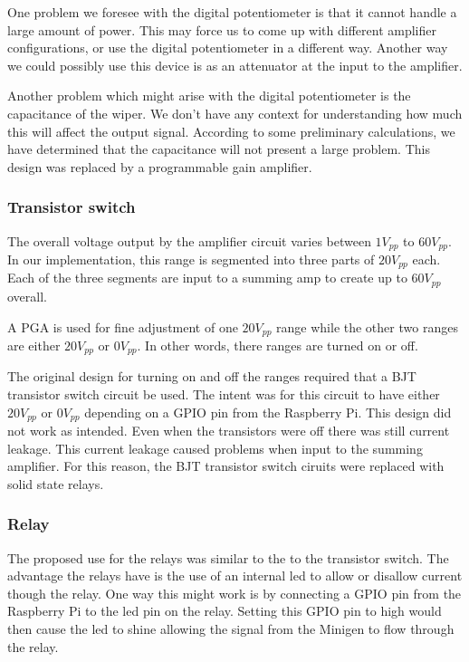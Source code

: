 \documentclass{article}	%
\begin{document}
\begin{multicols}{2}
One problem we foresee with the digital potentiometer is that it cannot handle a large amount of power. This may force us to come up with different amplifier configurations, or use the digital potentiometer in a different way. Another way we could possibly use this device is as an attenuator at the input to the amplifier.

Another problem which might arise with the digital potentiometer is the capacitance of the wiper. We don’t have any context for understanding how much this will affect the output signal. According to some preliminary calculations, we have determined that the capacitance will not present a large problem.
This design was replaced by a programmable gain amplifier.

\subsubsection{Transistor switch}
The overall voltage output by the amplifier circuit
varies between $1V_{pp}$ to $60V_{pp}$.
In our implementation,
this range is segmented into three parts of $20V_{pp}$ each.
Each of the three segments are input to a summing amp to
create up to $60V_{pp}$ overall.

A PGA is used for fine adjustment of one $20V_{pp}$ range while
the other two ranges are either $20V_{pp}$ or $0V_{pp}$.
In other words,
there ranges are turned on or off.

The original design for turning on and off the ranges
required that a BJT transistor switch circuit be used.
The intent was for this circuit to have either $20V_{pp}$ or $0V_{pp}$
depending on a GPIO pin from the Raspberry Pi.
This design did not work as intended.
Even when the transistors were off there was still current leakage.
This current leakage caused problems when input to the summing amplifier.
For this reason, the BJT transistor switch ciruits were replaced with solid state relays.

\subsubsection{Relay}
The proposed use for the relays was
similar to the to the transistor switch.
The advantage the relays have is the use
of an internal led to allow or disallow
current though the relay.
One way this might work is by
connecting a GPIO pin from the Raspberry Pi to
the led pin on the relay.
Setting this GPIO pin to high would then
cause the led to shine allowing the signal
from the Minigen to flow through the relay.


\end{multicols}
\end{document}
